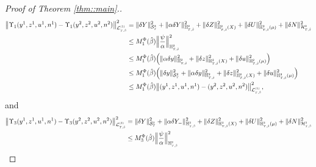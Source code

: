 \documentclass[10pt]{article} %
\newcommand\cH{\mathcal H}
\newcommand\cL{\mathcal L}
\newcommand\cS{\mathcal S}
\newcommand{\smalltext}[1]{\text{\fontsize{4}{4}\selectfont$#1$}}
\def \H{\mathbb{H}}
\newcommand{\1}{\mathbf{1}}
\begin{document}
\begin{proof}[Proof of Theorem \ref{thm::main}.]
\begin{align*}
		\big\| \Upsilon_1(y^1,z^1,u^1,n^1) - \Upsilon_1(y^2,z^2,u^2,n^2) \big\|^2_{\cL^\smalltext{(1)}_{\smalltext{T}\smalltext{,}\smalltext{\hat\beta}}} 
		&= \|\delta Y\|^2_{\cS^\smalltext{2}_\smalltext{T}} + \|\alpha\delta Y\|^2_{\H^\smalltext{2}_{\smalltext{T}\smalltext{,}\smalltext{\hat\beta}}} + \|\delta Z\|^2_{\H^\smalltext{2}_{\smalltext{T}\smalltext{,}\smalltext{\hat\beta}}(X)} + \|\delta U\|^2_{\H^\smalltext{2}_{\smalltext{T}\smalltext{,}\smalltext{\hat\beta}}(\mu)} + \|\delta N\|^2_{\cH^{\smalltext{2}}_{\smalltext{T}\smalltext{,}\smalltext{\hat\beta}}} \nonumber\\
		&\leq M^\Phi_1(\hat\beta) \Big\| \frac{\psi}{\alpha} \Big\|^2_{\H^\smalltext{2}_{\smalltext{T}\smalltext{,}\smalltext{\hat\beta}}} \nonumber\\
		&\leq M^\Phi_1(\hat\beta) \Big(\|\alpha\delta y\|^2_{\H^\smalltext{2}_{\smalltext{T}\smalltext{,}\smalltext{\hat\beta}}} + \|\delta z\|^2_{\H^\smalltext{2}_{\smalltext{T}\smalltext{,}\smalltext{\hat\beta}}(X)} + \|\delta u\|^2_{\H^\smalltext{2}_{\smalltext{T}\smalltext{,}\smalltext{\hat\beta}}(\mu)} \Big)  \nonumber\\
		&\leq M^\Phi_1(\hat\beta) \Big( \|\delta y\|^2_{\cS^\smalltext{2}_\smalltext{T}} + \|\alpha\delta y\|^2_{\H^\smalltext{2}_{\smalltext{T}\smalltext{,}\smalltext{\hat\beta}}} + \|\delta z\|^2_{\H^\smalltext{2}_{\smalltext{T}\smalltext{,}\smalltext{\hat\beta}}(X)} + \|\delta u\|^2_{\H^\smalltext{2}_{\smalltext{T}\smalltext{,}\smalltext{\hat\beta}}(\mu)} \Big)  \nonumber\\
		&\leq M^\Phi_1(\hat\beta) \big\|(y^1, z^1, u^1, n^1) - (y^2, z^2, u^2, n^2)\big\|^2_{\cL^\smalltext{(1)}_{\smalltext{T}\smalltext{,}\smalltext{\hat\beta}}},
	\end{align*}
	and
	\begin{align*}
		\big\| \Upsilon_3(y^1,z^1,u^1,n^1) - \Upsilon_3(y^2,z^2,u^2,n^2) \big\|^2_{\cL^\smalltext{(3)}_{\smalltext{T}\smalltext{,}\smalltext{\hat\beta}}} 
		&= \|\delta Y\|^2_{\cS^\smalltext{2}_\smalltext{T}} + \|\alpha\delta Y_-\|^2_{\H^\smalltext{2}_{\smalltext{T}\smalltext{,}\smalltext{\hat\beta}}} + \|\delta Z\|^2_{\H^\smalltext{2}_{\smalltext{T}\smalltext{,}\smalltext{\hat\beta}}(X)} + \|\delta U\|^2_{\H^\smalltext{2}_{\smalltext{T}\smalltext{,}\smalltext{\hat\beta}}(\mu)} + \|\delta N\|^2_{\cH^{\smalltext{2}}_{\smalltext{T}\smalltext{,}\smalltext{\hat\beta}}} \nonumber\\
		&\leq M^\Phi_3(\hat\beta)\Big\| \frac{\psi}{\alpha} \Big\|^2_{\H^\smalltext{2}_{\smalltext{T}\smalltext{,}\smalltext{\hat\beta}}} \nonumber\\

\end{align*}
\end{proof}
\end{document}
